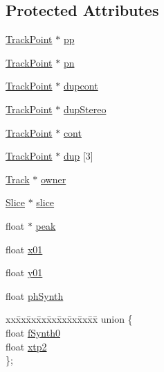 \subsection*{Protected Attributes}
\begin{DoxyCompactItemize}
\item 
\hyperlink{class__sbsms___1_1_track_point}{Track\+Point} $\ast$ \hyperlink{class__sbsms___1_1_track_point_aa7a3c4c70100b5d9374182583300a201}{pp}
\item 
\hyperlink{class__sbsms___1_1_track_point}{Track\+Point} $\ast$ \hyperlink{class__sbsms___1_1_track_point_a371956abd2d2e88a0868f5d297a920fe}{pn}
\item 
\hyperlink{class__sbsms___1_1_track_point}{Track\+Point} $\ast$ \hyperlink{class__sbsms___1_1_track_point_af7f2e46a67634b39ae83b468dc7d438e}{dupcont}
\item 
\hyperlink{class__sbsms___1_1_track_point}{Track\+Point} $\ast$ \hyperlink{class__sbsms___1_1_track_point_aa69dd2e05ec930117c65125c5fb8be14}{dup\+Stereo}
\item 
\hyperlink{class__sbsms___1_1_track_point}{Track\+Point} $\ast$ \hyperlink{class__sbsms___1_1_track_point_a558c76afaaa8201174c3565c2c0a2814}{cont}
\item 
\hyperlink{class__sbsms___1_1_track_point}{Track\+Point} $\ast$ \hyperlink{class__sbsms___1_1_track_point_aede5abd20bdecd151e1390c5965c12a7}{dup} \mbox{[}3\mbox{]}
\item 
\hyperlink{class__sbsms___1_1_track}{Track} $\ast$ \hyperlink{class__sbsms___1_1_track_point_adc8e196bd7b0c5e235c0e80670126be0}{owner}
\item 
\hyperlink{class__sbsms___1_1_slice}{Slice} $\ast$ \hyperlink{class__sbsms___1_1_track_point_a0bbb574684a95045de6423e8821e3dda}{slice}
\item 
float $\ast$ \hyperlink{class__sbsms___1_1_track_point_a1e81cff380f331d9169ce547dc02e0e9}{peak}
\item 
float \hyperlink{class__sbsms___1_1_track_point_a6041c05f4c19230b57baeddd88b6b3f9}{x01}
\item 
float \hyperlink{class__sbsms___1_1_track_point_a3dc3563437aecbf93acbe7c33dd114f9}{y01}
\item 
float \hyperlink{class__sbsms___1_1_track_point_a253c7f904e8090210a000e82c7117e75}{ph\+Synth}
\item 
\begin{tabbing}
xx\=xx\=xx\=xx\=xx\=xx\=xx\=xx\=xx\=\kill
union \{\\
\>float \hyperlink{class__sbsms___1_1_track_point_a969e3b568426e0293b39b1d2746ce645}{fSynth0}\\
\>float \hyperlink{class__sbsms___1_1_track_point_a275c4874945fa8b5eddcef6955c4225a}{xtp2}\\
\}; \\


\end{tabbing}
\end{DoxyCompactItemize}

